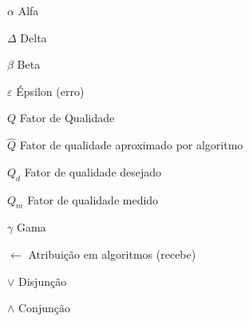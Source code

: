 \begin{simbolos}
  \item[$\alpha$] Alfa
  \item[$ \Delta $] Delta
  \item[$\beta$] Beta
  \item[$\varepsilon$] Épsilon (erro)
  \item[$Q$] Fator de Qualidade 
  \item[$\hat{Q}$] Fator de qualidade aproximado por algoritmo
  \item[$Q_d$] Fator de qualidade desejado
  \item[$Q_m$] Fator de qualidade medido
  \item[$\gamma$] Gama
  \item[$\gets$] Atribuição em algoritmos (recebe)
  \item[$\vee$] Disjunção
  \item[$\wedge$] Conjunção
\end{simbolos}
